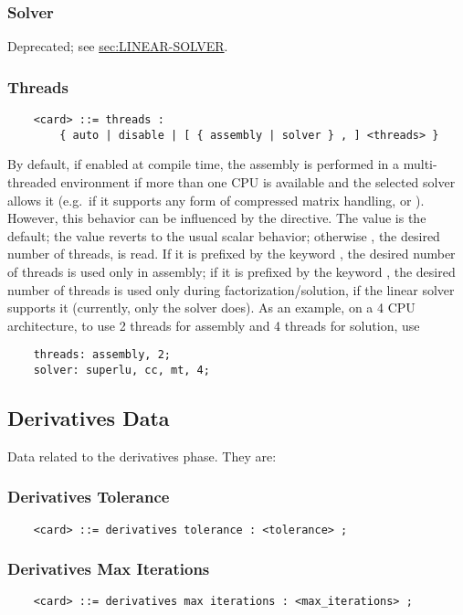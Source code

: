 \subsubsection{Solver}   
Deprecated; see
\hyperref{\kw{linear solver}}{\kw{linear solver} (Section~}{)}{sec:LINEAR-SOLVER}.


\subsubsection{Threads}   
\begin{verbatim}
    <card> ::= threads :
        { auto | disable | [ { assembly | solver } , ] <threads> }
\end{verbatim}
By default, if enabled at compile time, the assembly is performed
in a multi-threaded environment if more than one CPU is available 
and the selected solver allows it (e.g.\ if it supports any form 
of compressed matrix handling,  or ).
However, this behavior can be influenced by the  directive.
The value  is the default; the value  reverts
to the usual scalar behavior; otherwise , the desired 
number of threads, is read.
If it is prefixed by the keyword , the desired number
of threads is used only in assembly; if it is prefixed by the keyword
, the desired number of threads is used only during 
factorization/solution, if the linear solver supports it (currently,
only the  solver does).
As an example, on a 4 CPU architecture, to use 2 threads for assembly
and 4 threads for solution, use
\begin{verbatim}
    threads: assembly, 2;
    solver: superlu, cc, mt, 4;
\end{verbatim}





\subsection{Derivatives Data}
Data related to the derivatives phase. They are:


\subsubsection{Derivatives Tolerance}
\begin{verbatim}
    <card> ::= derivatives tolerance : <tolerance> ;
\end{verbatim}

\subsubsection{Derivatives Max Iterations}
\begin{verbatim}
    <card> ::= derivatives max iterations : <max_iterations> ;
\end{verbatim}

